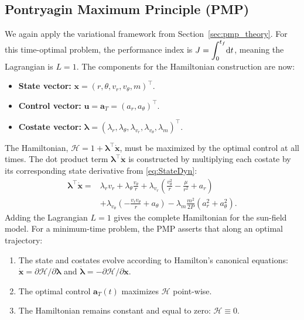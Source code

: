 \documentclass[journal, a4paper]{IEEEtran}
\begin{document}
\subsection{Pontryagin Maximum Principle (PMP)}
We again apply the variational framework from Section~\ref{sec:pmp_theory}. For this time-optimal problem, the performance index is $J=\displaystyle\int_{0}^{t_f}\!{\rm d}t$, meaning the Lagrangian is $L=1$. The components for the Hamiltonian construction are now:
\begin{itemize}
    \item \textbf{State vector:} $\mathbf{x} = (r, \theta, v_r, v_\theta, m)^\top$.
    \item \textbf{Control vector:} $\mathbf{u} = \mathbf{a}_T = (a_r, a_\theta)^\top$.
    \item \textbf{Costate vector:} $\boldsymbol{\lambda} = (\lambda_r, \lambda_\theta, \lambda_{v_r}, \lambda_{v_\theta}, \lambda_m)^\top$.
\end{itemize}
\medskip
The Hamiltonian, $\mathcal{H} = 1 + \boldsymbol{\lambda}^\top \dot{\mathbf{x}}$, must be maximized by the optimal control at all times. The dot product term $\boldsymbol{\lambda}^\top \dot{\mathbf{x}}$ is constructed by multiplying each costate by its corresponding state derivative from \eqref{eq:StateDyn}:
\begin{align}
\boldsymbol{\lambda}^\top \dot{\mathbf{x}} = {} & \lambda_r v_r + \lambda_\theta\frac{v_\theta}{r} + \lambda_{v_r}\left(\frac{v_\theta^2}{r} - \frac{\mu}{r^2} + a_r\right) \nonumber\\
& + \lambda_{v_\theta}\left(-\frac{v_r v_\theta}{r} + a_\theta\right) - \lambda_m\frac{m^2}{2P}(a_r^2+a_\theta^2).
\end{align}
Adding the Lagrangian $L=1$ gives the complete Hamiltonian for the sun-field model. For a minimum-time problem, the PMP asserts that along an optimal trajectory:
\begin{enumerate}
    \item The state and costates evolve according to Hamilton's
          canonical equations: $\dot{\mathbf{x}} = \partial\mathcal{H}/\partial\boldsymbol{\lambda}$
          and $\dot{\boldsymbol{\lambda}} = -\partial\mathcal{H}/\partial\mathbf{x}$.
    \item The optimal control $\mathbf{a}_T(t)$ maximizes $\mathcal{H}$ point-wise.
    \item The Hamiltonian remains constant and equal to zero: $\mathcal H\equiv 0$.
\end{enumerate}
\end{document}
